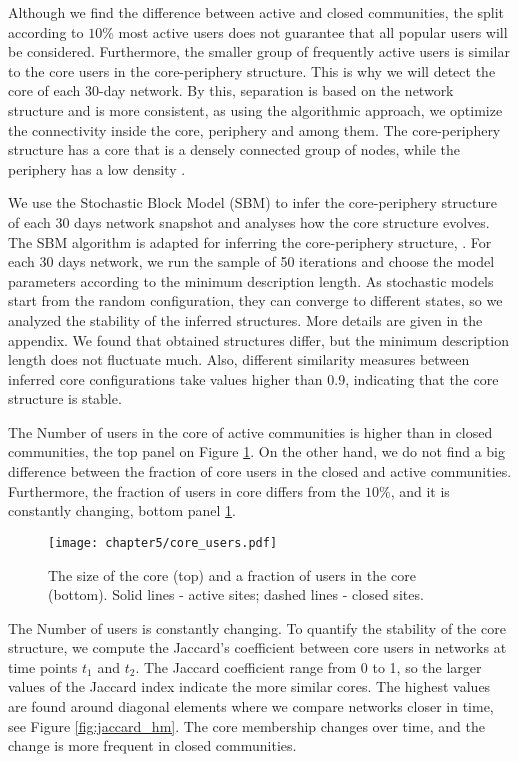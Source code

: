 Although we find the difference between active and closed communities, the split according to $10\%$  most active users does not guarantee that all popular users will be considered. Furthermore, the smaller group of frequently active users is similar to the core users in the core-periphery structure. This is why we will detect the core of each 30-day network. By this, separation is based on the network structure and is more consistent, as using the algorithmic approach, we optimize the connectivity inside the core, periphery and among them. The core-periphery structure has a core that is a densely connected group of nodes, while the periphery has a low density \cite{fortunato2010community, gallagher2020clarified}. 

We use the Stochastic Block Model (SBM) to infer the core-periphery structure of each 30 days network snapshot and analyses how the core structure evolves. The  SBM algorithm is adapted for inferring the core-periphery structure, \cite{gallagher2020clarified}. For each 30 days network, we run the sample of 50 iterations and choose the model parameters according to the minimum description length. As stochastic models start from the random configuration, they can converge to different states, so we analyzed the stability of the inferred structures. More details are given in the appendix. We found that obtained structures differ, but the minimum description length does not fluctuate much. Also, different similarity measures between inferred core configurations take values higher than 0.9, indicating that the core structure is stable. 

The Number of users in the core of active communities is higher than in closed communities, the top panel on Figure \ref{fig:core_size}. On the other hand, we do not find a big difference between the fraction of core users in the closed and active communities. Furthermore, the fraction of users in core differs from the $10\%$, and it is constantly changing, bottom panel \ref{fig:core_size}. 

\begin{figure}[h!]
	\centering
	\texttt{[image: chapter5/core\_users.pdf]}
	\caption[The size of the core]{The size of the core (top) and a fraction of users in the core (bottom). Solid lines - active sites; dashed lines - closed sites.}
	\label{fig:core_size}
\end{figure}

The Number of users is constantly changing. To quantify the stability of the core structure, we compute the Jaccard’s coefficient between core users in networks at time points $t_1$ and $t_2$. The Jaccard coefficient range from 0 to 1, so the larger values of the Jaccard index indicate the more similar cores. 
The highest values are found around diagonal elements where we compare networks closer in time, see Figure \ref{fig:jaccard_hm}. The core membership changes over time, and the change is more frequent in closed communities. 

